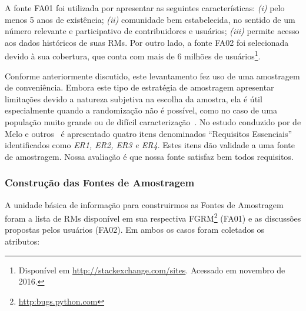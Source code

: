 A fonte FA01 foi utilizada por apresentar as seguintes características:
\textit{(i)} pelo menos 5 anos de existência; \textit{(ii)} comunidade bem
estabelecida, no sentido de um número relevante e participativo de
contribuidores e usuários; \textit{(iii)} permite acesso aos dados históricos de
suas RMs. Por outro lado, a fonte FA02 foi selecionada devido à sua cobertura,
que conta com mais de 6 milhões de usuários\footnote{Disponível em
    \url{http://stackexchange.com/sites}. Acessado em novembro de 2016.}.

Conforme anteriormente discutido, este levantamento fez uso de uma amostragem de
conveniência. Embora este tipo de estratégia de amostragem apresentar limitações
devido a natureza subjetiva na escolha da amostra, ela é útil especialmente
quando a randomização não é possível, como no caso de uma população muito grande
ou de difícil caracterização~\cite{boxill1997introduction}. No estudo conduzido
por de Melo e outros~\cite{de2014towards} é apresentado quatro itens denominados
``Requisitos Essenciais'' identificados como \textit{ER1, ER2, ER3 e ER4}. Estes
itens dão validade a uma fonte de amostragem. Nossa avaliação é que nossa fonte
satisfaz bem todos requisitos.



\subsubsection{Construção das Fontes de Amostragem}
\label{subsubsec:construcao_fonte_amostragem}

A unidade básica de informação para construirmos as Fontes de Amostragem foram a
lista de RMs disponível em sua respectiva
FGRM\footnote{\url{http:bugs.python.com}} (FA01) e as discussões propostas pelos
usuários (FA02). Em ambos os casos foram coletados os atributos:

